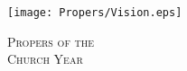 \fancyhead[RE,LO]{}\fancyhead[RO,LE]{}
\fancyhead[C]{}\thispagestyle{empty}
{}

\begin{figure}[H]
    \centering
    \texttt{[image: Propers/Vision.eps]}
    \caption{\textsc{\Huge{Propers of the\\
   	Church Year}}}
\end{figure}